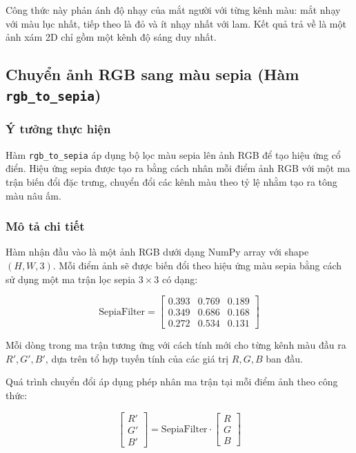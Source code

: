 Công thức này phản ánh độ nhạy của mắt người với từng kênh màu: mắt nhạy với màu lục nhất, tiếp theo là đỏ và ít nhạy nhất với lam. Kết quả trả về là một ảnh xám 2D chỉ gồm một kênh độ sáng duy nhất.

\subsection{Chuyển ảnh RGB sang màu sepia (Hàm \texttt{rgb\_to\_sepia})}

\subsubsection*{Ý tưởng thực hiện}

Hàm \texttt{rgb\_to\_sepia} áp dụng bộ lọc màu sepia lên ảnh RGB để tạo hiệu ứng cổ điển. Hiệu ứng sepia được tạo ra bằng cách nhân mỗi điểm ảnh RGB với một ma trận biến đổi đặc trưng, chuyển đổi các kênh màu theo tỷ lệ nhằm tạo ra tông màu nâu ấm.

\subsubsection*{Mô tả chi tiết}

Hàm nhận đầu vào là một ảnh RGB dưới dạng NumPy array với shape \((H, W, 3)\). Mỗi điểm ảnh sẽ được biến đổi theo hiệu ứng màu sepia bằng cách sử dụng một ma trận lọc sepia \(3 \times 3\) có dạng:

\[
  \text{SepiaFilter} =
  \begin{bmatrix}
    0.393 & 0.769 & 0.189 \\
    0.349 & 0.686 & 0.168 \\
    0.272 & 0.534 & 0.131
  \end{bmatrix}
\]

Mỗi dòng trong ma trận tương ứng với cách tính mới cho từng kênh màu đầu ra \(R', G', B'\), dựa trên tổ hợp tuyến tính của các giá trị \(R, G, B\) ban đầu.

Quá trình chuyển đổi áp dụng phép nhân ma trận tại mỗi điểm ảnh theo công thức:

\[
  \begin{bmatrix}
    R' \\
    G' \\
    B'
  \end{bmatrix}
  =
  \text{SepiaFilter} \cdot
  \begin{bmatrix}
    R \\
    G \\
    B
  \end{bmatrix}
\]

